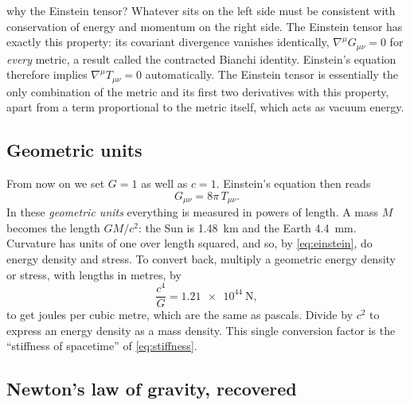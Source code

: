 \begin{deeper}{why the Einstein tensor?}
Whatever sits on the left side must be consistent with conservation of energy
and momentum on the right side. The Einstein tensor has exactly this property:
its covariant divergence vanishes identically, $\nabla^{\mu}G_{\mu\nu} = 0$ for
\emph{every} metric, a result called the contracted Bianchi identity. Einstein's
equation therefore implies $\nabla^{\mu}T_{\mu\nu} = 0$ automatically. The
Einstein tensor is essentially the only combination of the metric and its first
two derivatives with this property, apart from a term proportional to the metric
itself, which acts as vacuum energy.
\end{deeper}

\subsection{Geometric units}

From now on we set $G = 1$ as well as $c = 1$. Einstein's equation then reads
\begin{equation}
  G_{\mu\nu} = 8\pi\,T_{\mu\nu}.
  \label{eq:einstein}
\end{equation}
In these \emph{geometric units} everything is measured in powers of length.
A mass $M$ becomes the length $GM/c^{2}$: the Sun is \SI{1.48}{\kilo\metre}
and the Earth \SI{4.4}{\milli\metre}. Curvature has units of one over length
squared, and so, by \cref{eq:einstein}, do energy density and stress. To
convert back, multiply a geometric energy density or stress, with lengths in
metres, by
\begin{equation}
  \frac{c^{4}}{G} = \SI{1.21e44}{\newton},
  \label{eq:conversion}
\end{equation}
to get joules per cubic metre, which are the same as pascals. Divide by $c^{2}$
to express an energy density as a mass density. This single conversion factor
is the \enquote{stiffness of spacetime} of \cref{eq:stiffness}.

\subsection{Newton's law of gravity, recovered}

